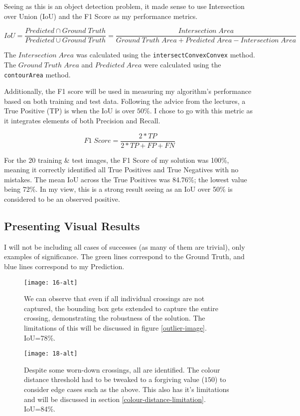 \documentclass{article}  %
\begin{document}
	Seeing as this is an object detection problem, it made sense to use Intersection over Union (IoU) and the F1 Score as my performance metrics.
	
	\[ IoU = \frac{Predicted \cap Ground\; Truth}{Predicted \cup Ground\; Truth} = \frac{Intersection\; Area}{Ground\; Truth\; Area + Predicted\; Area - Intersection\; Area} \]
	
	The $Intersection\; Area$ was calculated using the \verb|intersectConvexConvex| method. The $Ground\; Truth\; Area$ and $Predicted\; Area$ were calculated using the \verb|contourArea| method.\newline
	
	Additionally, the F1 score will be used in measuring my algorithm's performance based on both training and test data. Following the advice from the lectures, a True Positive (TP) is when the IoU is over $50\%$. I chose to go with this metric as it integrates elements of both Precision and Recall.
	
	\[ F1\; Score = \frac{2*TP}{2*TP+FP+FN} \]
	
	For the 20 training \& test images, the F1 Score of my solution was 100\%, meaning it correctly identified all True Positives and True Negatives with no mistakes. The mean IoU across the True Positives was 84.76\%; the lowest value being 72\%. In my view, this is a strong result seeing as an IoU over 50\% is considered to be an observed positive.
	
	\newpage
	\subsection{Presenting Visual Results}
	
	I will not be including all cases of successes (as many of them are trivial), only examples of significance. The green lines correspond to the Ground Truth, and blue lines correspond to my Prediction.
	
	\begin{figure}[H]
		\begin{minipage}[c]{0.45\linewidth}
			\centering
			\texttt{[image: 16-alt]}
			\caption{We can observe that even if all individual crossings are not captured, the bounding box gets extended to capture the entire crossing, demonstrating the robustness of the solution. The limitations of this will be discussed in figure \ref{outlier-image}. IoU=78\%.}
		\end{minipage}\hfill
		\begin{minipage}[c]{0.45\linewidth}
			\centering
			\texttt{[image: 18-alt]}
			\caption{Despite some worn-down crossings, all are identified. The colour distance threshold had to be tweaked to a forgiving value ($150$) to consider edge cases such as the above. This also has it's limitations and will be discussed in section \ref{colour-distance-limitation}. IoU=84\%.}
		\end{minipage}
	\end{figure}
	
\end{document}
